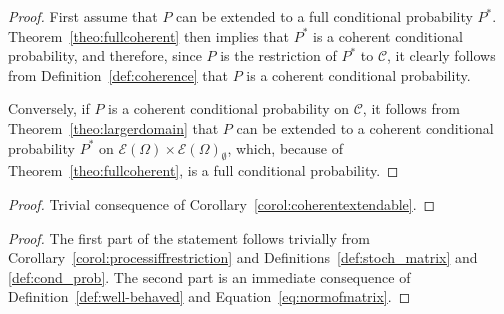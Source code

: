 \documentclass[10pt,a4paper]{paper}
\theoremstyle{definition}
\newcommand{\paths}{\Omega}
\newcommand{\power}{\mathcal{E}(\paths)}
\newcommand{\nonemptypower}{\power_{\emptyset}}
\begin{document}
\corolcoherentextendable*
\begin{proof}
First assume that $P$ can be extended to a full conditional probability $P^*$. Theorem~\ref{theo:fullcoherent} then implies that $P^*$ is a coherent conditional probability, and therefore, since $P$ is the restriction of $P^*$ to $\mathcal{C}$, it clearly follows from Definition~\ref{def:coherence} that $P$ is a coherent conditional probability.

Conversely, if $P$ is a coherent conditional probability on $\mathcal{C}$, it follows from Theorem~\ref{theo:largerdomain} that $P$ can be extended to a coherent conditional probability $P^*$ on $\power\times\nonemptypower$, which, because of Theorem~\ref{theo:fullcoherent}, is a full conditional probability.
\end{proof}

\corolprocessiffrestriction*
\begin{proof}
Trivial consequence of Corollary~\ref{corol:coherentextendable}.
\end{proof}

\propstochasticprocesssimpleproperties*
\begin{proof}
The first part of the statement follows trivially from Corollary~\ref{corol:processiffrestriction} and Definitions~\ref{def:stoch_matrix} and \ref{def:cond_prob}. The second part is an immediate consequence of Definition~\ref{def:well-behaved} and Equation~\eqref{eq:normofmatrix}.
\end{proof}
\end{document}
